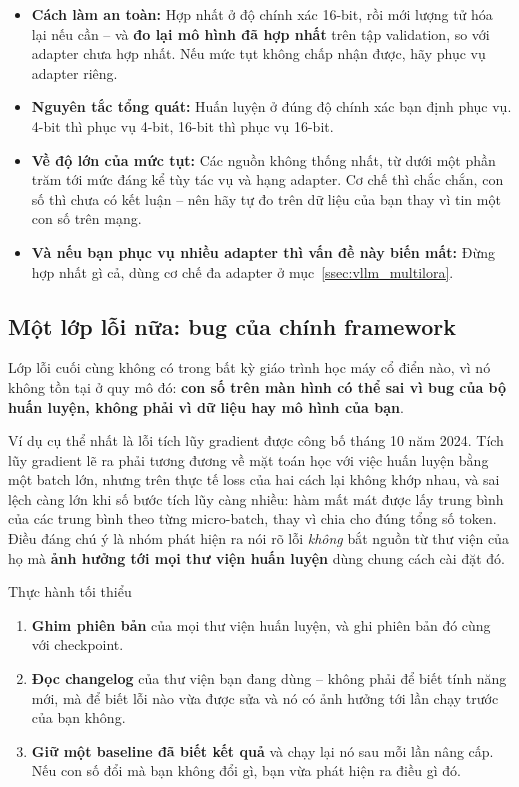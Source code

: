 \begin{itemize}
	\item \textbf{Cách làm an toàn:} Hợp nhất ở độ chính xác 16-bit, rồi mới lượng tử hóa lại nếu cần -- và \textbf{đo lại mô hình đã hợp nhất} trên tập validation, so với adapter chưa hợp nhất. Nếu mức tụt không chấp nhận được, hãy phục vụ adapter riêng.
	\item \textbf{Nguyên tắc tổng quát:} Huấn luyện ở đúng độ chính xác bạn định phục vụ. 4-bit thì phục vụ 4-bit, 16-bit thì phục vụ 16-bit.
	\item \textbf{Về độ lớn của mức tụt:} Các nguồn không thống nhất, từ dưới một phần trăm tới mức đáng kể tùy tác vụ và hạng adapter. Cơ chế thì chắc chắn, con số thì chưa có kết luận -- nên hãy tự đo trên dữ liệu của bạn thay vì tin một con số trên mạng.
	\item \textbf{Và nếu bạn phục vụ nhiều adapter thì vấn đề này biến mất:} Đừng hợp nhất gì cả, dùng cơ chế đa adapter ở mục~\ref{ssec:vllm_multilora}.
\end{itemize}

\subsection{Một lớp lỗi nữa: bug của chính framework}
\label{ssec:framework_bugs}

Lớp lỗi cuối cùng không có trong bất kỳ giáo trình học máy cổ điển nào, vì nó không tồn tại ở quy mô đó: \textbf{con số trên màn hình có thể sai vì bug của bộ huấn luyện, không phải vì dữ liệu hay mô hình của bạn}.

Ví dụ cụ thể nhất là lỗi tích lũy gradient được công bố tháng 10 năm 2024. Tích lũy gradient lẽ ra phải tương đương về mặt toán học với việc huấn luyện bằng một batch lớn, nhưng trên thực tế loss của hai cách lại không khớp nhau, và sai lệch càng lớn khi số bước tích lũy càng nhiều: hàm mất mát được lấy trung bình của các trung bình theo từng micro-batch, thay vì chia cho đúng tổng số token. Điều đáng chú ý là nhóm phát hiện ra nói rõ lỗi \emph{không} bắt nguồn từ thư viện của họ mà \textbf{ảnh hưởng tới mọi thư viện huấn luyện} dùng chung cách cài đặt đó.

\begin{checklist}{Thực hành tối thiểu}
\begin{enumerate}
	\item \textbf{Ghim phiên bản} của mọi thư viện huấn luyện, và ghi phiên bản đó cùng với checkpoint.
	\item \textbf{Đọc changelog} của thư viện bạn đang dùng -- không phải để biết tính năng mới, mà để biết lỗi nào vừa được sửa và nó có ảnh hưởng tới lần chạy trước của bạn không.
	\item \textbf{Giữ một baseline đã biết kết quả} và chạy lại nó sau mỗi lần nâng cấp. Nếu con số đổi mà bạn không đổi gì, bạn vừa phát hiện ra điều gì đó.
\end{enumerate}
\end{checklist}

